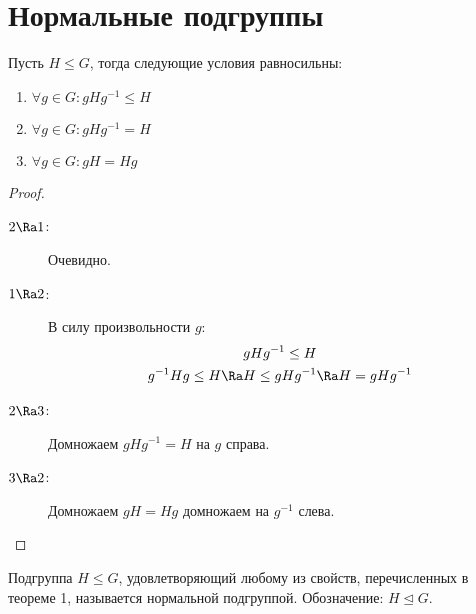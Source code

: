 \section{Нормальные подгруппы}

\begin{theorem}
	Пусть $H \le G$, тогда следующие условия равносильны:
	\begin{enumerate}
		\item $\forall g \in G \colon gHg^{-1} \le H$
		\item $\forall g \in G \colon gHg^{-1} = H$
		\item $\forall g \in G \colon gH = Hg$
	\end{enumerate}
\end{theorem}
\begin{proof}\begin{description}
\item[$2 \Ra 1$:]
	Очевидно.

\item[$1 \Ra 2$:]
	В силу произвольности $g$:
	\begin{gather*}
		gHg^{-1} \le H \\
		g^{-1}Hg \le H \Ra H \le gHg^{-1} \Ra H = gHg^{-1}
	\end{gather*}

\item[$2 \Ra 3$:]
	Домножаем $gHg^{-1} = H$ на $g$ справа.

\item[$3 \Ra 2$:]
	Домножаем $gH = Hg$ домножаем на $g^{-1}$ слева.
\end{description}\end{proof}

\begin{Def}
	Подгруппа $H \le G$, удовлетворяющий любому из свойств, перечисленных в теореме 1, называется нормальной подгруппой.
	Обозначение: $H \unlhd G$.
\end{Def}

